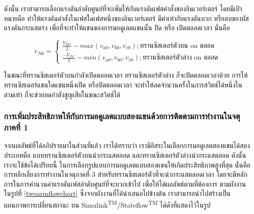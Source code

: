 \documentclass[11pt,a4paper]{article}
\begin{document}
ดังนั้น เราสามารถเลือกแรงดันลำดับศูนย์ที่จะเพิ่มให้กับแรงดันเฟสคำสั่งของอินเวอร์เตอร์ โดยมีเป้าหมายคือ ทำให้แรงดันคำสั่งในเฟสใดเฟสหนึ่งของอินเวอร์เตอร์ มีค่าเท่ากับแรงดันบวก หรือลบของบัสแรงดันกระแสตรง เพื่อที่จะทำให้แขนของการมอดูเลตแขนนั้น ปิด หรือ เปิดตลอดเวลา นั่นคือ

\begin{equation}
    v_{N0} = \begin{cases}
        \frac{V_{DC}}{2}-max(v_{a0},v_{b0},v_{c0}); \text{ทรานซิสเตอร์ตัวบน on ตลอด} \\
        \frac{-V_{DC}}{2}-min(v_{a0},v_{b0},v_{c0}); \text{ทรานซิสเตอร์ตัวล่าง on ตลอด}
    \end{cases}
\end{equation}

ในขณะที่ทรานซิสเตอร์ตัวบนกำลังเปิดตลอดเวลา ทรานซิสเตอร์ตัวล่าง ก็จะปิดตลอดเวลาด้วย การให้ทรานซิสเตอร์แขนใดแขนหนึ่งเปิด หรือปิดตลอดเวลา จะทำให้ลดจำนวนครั้งในการสวิตช์ได้หนึ่งในสามเท่า ก็จะช่วยลดกำลังสูญเสียในขณะสวิตช์ได้

\subsubsection{การเพิ่มประสิทธิภาพให้กับการมอดูเลตแบบสองแขนด้วยการติดตามการทำงานในจตุภาคที่ 1}

จากผลลัพธ์ที่ได้อภิปรายมาในส่วนที่แล้ว เราได้ทราบว่า เรามีอิสระในเลือกการมอดูเลตสองแขนได้สองประเภทคือ แบบทรานซิสเตอร์ตัวบนนำกระแสตลอด และทรานซิสเตอร์ตัวล่างนำกระแสตลอด ดังนั้น เราจะใช้ข้อได้เปรียบนี้ ในการเลือกรูปแบบการมอดูเลตแบบสองแขนให้เกิดประสิทธิภาพสูงที่สุด นั่นคือ การหลีกเลี่ยงการทำงานในจตุภาคที่ 3 สำหรับทรานซิสเตอร์ตัวที่จะนำกระแสตลอดเวลา โดยจะมีหลักการในการคำนวนค่าแรงดันเฟสลำดับศูนย์ที่จะบวกเข้าไป เพื่อให้ได้ผลลัพธ์ตามที่ต้องการ ตามผังงานในรูปที่ \ref{twoarmflowchart} ซึ่งจากผังงานที่ได้นำเสนอไปข้างต้น เราสามารถนำไปสร้างเป็นแผนภาพการเปลี่ยนสถานะ บน Simulink\textsuperscript{TM}/Stateflow\textsuperscript{TM} ได้ดังที่แสดงไว้ในรูป
\end{document}
